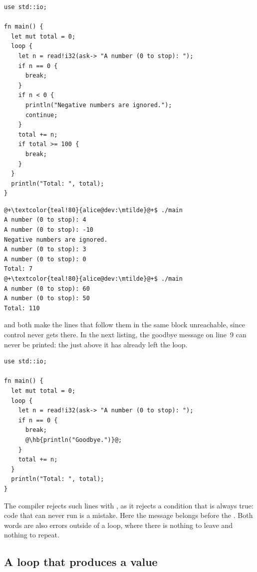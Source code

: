 \begin{lstlisting}[style=coloredverbatim, caption=Skipping an iteration, label=lst:control:continue]
use std::io;

fn main() {
  let mut total = 0;
  loop {
    let n = read!i32(ask-> "A number (0 to stop): ");
    if n == 0 {
      break;
    }
    if n < 0 {
      println("Negative numbers are ignored.");
      continue;
    }
    total += n;
    if total >= 100 {
      break;
    }
  }
  println("Total: ", total);
}
\end{lstlisting}
\vspace{-10pt}%
\begin{lstlisting}[style=bashVerb, escapechar=@+]
@+\textcolor{teal!80}{alice@dev:\mtilde}@+$ ./main
A number (0 to stop): 4
A number (0 to stop): -10
Negative numbers are ignored.
A number (0 to stop): 3
A number (0 to stop): 0
Total: 7
@+\textcolor{teal!80}{alice@dev:\mtilde}@+$ ./main
A number (0 to stop): 60
A number (0 to stop): 50
Total: 110
\end{lstlisting}



 and  both make the lines that follow them in the
same block unreachable, since control never gets there. In the next listing,
the goodbye message on line~9 can never be printed: the  just
above it has already left the loop.

\begin{lstlisting}[style=coloredverbatimError, escapechar=@, caption=An instruction after a \token{break}]
use std::io;

fn main() {
  let mut total = 0;
  loop {
    let n = read!i32(ask-> "A number (0 to stop): ");
    if n == 0 {
      break;
      @\hb{println("Goodbye.")}@;
    }
    total += n;
  }
  println("Total: ", total);
}
\end{lstlisting}

The compiler rejects such lines with , as
it rejects a
condition that is always true: code that can never run is a mistake. Here the
message belongs before the . Both words are also errors outside of
a loop, where there is nothing to leave and nothing to repeat.

\subsection{A loop that produces a value}

